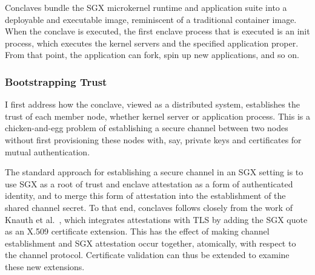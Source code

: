 Conclaves bundle the SGX microkernel runtime and application suite into a
deployable and executable image, reminiscent of a traditional container image.
%
When the conclave is executed, the first enclave process that is
executed is an init process, which executes the kernel servers and the
specified application proper.
%
From that point, the application can fork, spin up new applications,
and so on.


\subsubsection{Bootstrapping Trust} %


I first address how the conclave, viewed as a distributed system,
establishes the trust of each member node, whether kernel server or
application process.
%
This is a chicken-and-egg problem of establishing a secure channel
between two nodes without first provisioning these nodes with, say,
private keys and certificates for mutual authentication.
%



The standard approach for establishing a secure channel in an SGX setting is to use SGX
as a root of trust and enclave attestation as a form of authenticated identity,
and to merge this form of attestation into the establishment of the shared
channel secret.
%
To that end, conclaves follows closely from the work of Knauth et
al.~\cite{DBLP:journals/corr/abs-1801-05863}, which 
integrates attestations with TLS by adding the SGX quote as an X.509
certificate extension.
%
This has the effect of making channel establishment and SGX attestation
occur together,
atomically, with respect to the channel protocol.
%
Certificate validation can thus be extended to examine these new extensions.


